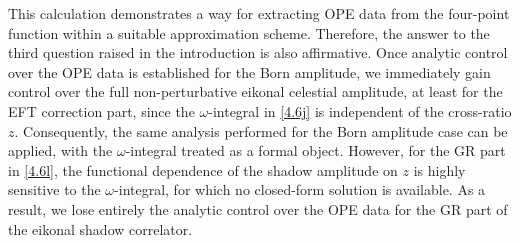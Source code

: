 This calculation demonstrates a way for extracting OPE data from the four-point function within a suitable approximation scheme. Therefore, the answer to the third question raised in the introduction is also affirmative. Once analytic control over the OPE data is established for the Born amplitude, we immediately gain control over the full non-perturbative eikonal celestial amplitude, at least for the EFT correction part, since the $\omega$-integral in \eqref{4.6j} is independent of the cross-ratio $z$. Consequently, the same analysis performed for the Born amplitude case can be applied, with the $\omega$-integral treated as a formal object. However, for the GR part in \eqref{4.6l}, the functional dependence of the shadow amplitude on $z$ is highly sensitive to the $\omega$-integral, for which no closed-form solution is available. As a result, we lose entirely the analytic control over the OPE data for the GR part of the eikonal shadow correlator.

